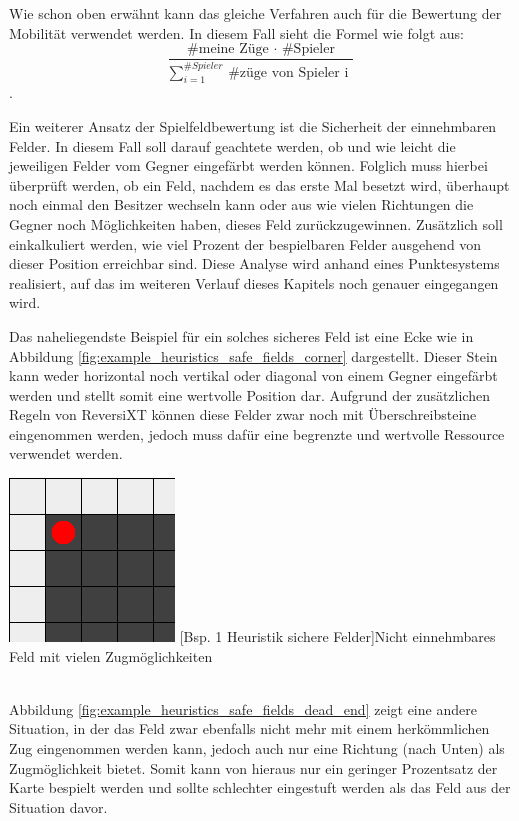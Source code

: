 \documentclass[12pt,a4paper,bibliography=totocnumbered,listof=totocnumbered]{article}
\begin{document}
Wie schon oben erwähnt kann das gleiche Verfahren auch für die Bewertung der Mobilität verwendet werden. In diesem Fall sieht die Formel wie folgt aus:
\[ \frac{ \text{ \# meine Züge } \cdot \text{ \# Spieler } }{ \sum_{i=1}^{ \#Spieler} \text{ \# züge von Spieler i } }  \].


Ein weiterer Ansatz der Spielfeldbewertung ist die \glqq Sicherheit\grqq{} der einnehmbaren Felder. In diesem Fall soll darauf geachtete werden, ob und wie leicht die jeweiligen Felder vom Gegner eingefärbt werden können. Folglich muss hierbei überprüft werden, ob ein Feld, nachdem es das erste Mal besetzt wird, überhaupt noch einmal den Besitzer wechseln kann oder aus wie vielen Richtungen die Gegner noch Möglichkeiten haben, dieses Feld zurückzugewinnen. Zusätzlich soll einkalkuliert werden, wie viel Prozent der bespielbaren Felder ausgehend von dieser Position erreichbar sind. Diese Analyse wird anhand eines Punktesystems realisiert, auf das im weiteren Verlauf dieses Kapitels noch genauer eingegangen wird.

Das naheliegendste Beispiel für ein solches sicheres Feld ist eine Ecke wie in Abbildung \ref{fig:example_heuristics_safe_fields_corner} dargestellt. Dieser Stein kann weder horizontal noch vertikal oder diagonal von einem Gegner eingefärbt werden und stellt somit eine wertvolle Position dar. Aufgrund der zusätzlichen Regeln von ReversiXT können diese Felder zwar noch mit Überschreibsteine eingenommen werden, jedoch muss dafür eine begrenzte und wertvolle Ressource verwendet werden.

\vspace{1em}
\begin{minipage}{\linewidth}
	\centering
	\includegraphics[width=0.3\linewidth]{pics/heuristics_safe_fields_corner.png}
	[Bsp. 1 Heuristik sichere Felder]{Nicht einnehmbares Feld mit vielen 		Zugmöglichkeiten}
	\label{fig:example_heuristics_safe_fields_corner}
\end{minipage}
\\

Abbildung \ref{fig:example_heuristics_safe_fields_dead_end} zeigt eine andere Situation, in der das Feld zwar ebenfalls nicht mehr mit einem herkömmlichen Zug eingenommen werden kann, jedoch auch nur eine Richtung (nach Unten) als Zugmöglichkeit bietet. Somit kann von hieraus nur ein geringer Prozentsatz der Karte bespielt werden und sollte schlechter eingestuft werden als das Feld aus der Situation davor.
\end{document}
